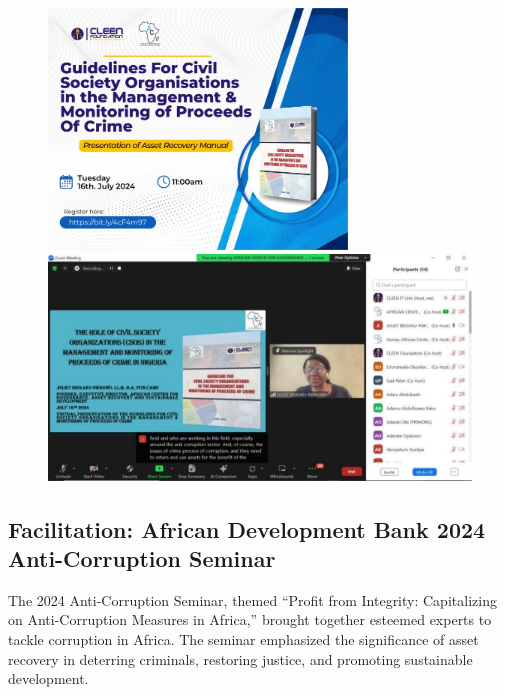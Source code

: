 \documentclass[
  letterpaper,
  DIV=11,
  numbers=noendperiod]{scrreprt}
\begin{document}
\begin{figure}

\begin{minipage}{0.40\linewidth}
\includegraphics[width=3.125in,height=\textheight,keepaspectratio]{images/strengthen/11_0_guide.png}\end{minipage}%
%
\begin{minipage}{0.60\linewidth}
\includegraphics[width=4.6875in,height=\textheight,keepaspectratio]{images/strengthen/11_1_guide.jpg}\end{minipage}%

\end{figure}%

\subsection{Facilitation: African Development Bank 2024 Anti-Corruption
Seminar}\label{facilitation-african-development-bank-2024-anti-corruption-seminar}

The 2024 Anti-Corruption Seminar, themed ``Profit from Integrity:
Capitalizing on Anti-Corruption Measures in Africa,'' brought together
esteemed experts to tackle corruption in Africa. The seminar emphasized
the significance of asset recovery in deterring criminals, restoring
justice, and promoting sustainable development.
\end{document}
